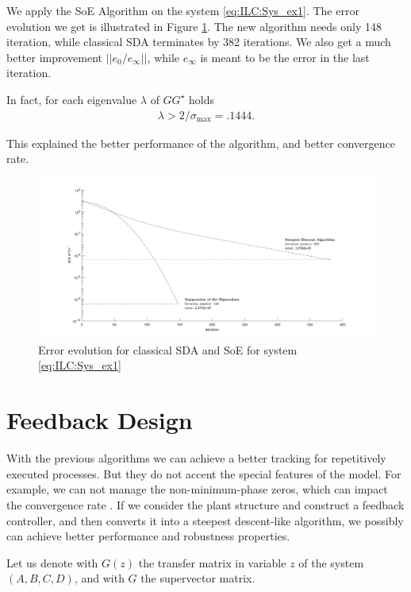 \begin{exam}
	We apply the SoE Algorithm on the system \eqref{eq:ILC:Sys_ex1}. The error evolution we get is illustrated in Figure \ref{img:ILC:SDAvsSE}. The new algorithm needs only 148 iteration, while classical SDA terminates by 382 iterations. We also get a much better improvement $||e_0/e_\infty||$, while $e_\infty$  is meant to be the error in the last iteration. 
	
	In fact, for each eigenvalue $\lambda$ of $G G^\star$ holds 
	\begin{align}
	\lambda > 2/\sigma_{\max} = .1444. 
	\end{align}
	
	This explained the better performance of the algorithm, and better convergence rate.  		
	\begin{figure}[ht]
		\centering
		\includegraphics[width=\textwidth]{fig/SDAvsSE.jpg}
		\caption{Error evolution for classical SDA and SoE for system \eqref{eq:ILC:Sys_ex1}}
		\label{img:ILC:SDAvsSE}
	\end{figure}
	
\end{exam}

\section{Feedback Design}

With the previous algorithms we can achieve a better tracking for repetitively executed processes.  But they do not accent the special features of the model. For example, we can not manage the non-minimum-phase zeros, which can impact the convergence rate \cite{ILC}. 
If we consider the plant structure and construct a feedback controller, and then converts it into a steepest descent-like algorithm, we possibly can achieve better performance and robustness properties. 

Let us denote with $G(z)$ the transfer matrix in variable $z$ of the system $(A,B,C,D)$, and with $G$ the supervector matrix. 

